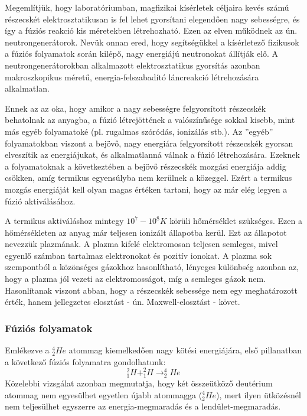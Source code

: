 \documentclass[../main.tex]{subfiles}
\begin{document}
Megemlítjük, hogy laboratóriumban, magfizikai kísérletek céljaira kevés számú részecskét elektrosztatikusan is fel lehet gyorsítani elegendően nagy sebességre, és így a
fúziós reakció kis méretekben létrehozható. Ezen az elven működnek az ún. neutrongenerátorok. Nevük onnan ered, hogy segítségükkel a kísérletező fizikusok a fúziós folyamatok
során kilépő, nagy energiájú neutronokat állítják elő. A neutrongenerátorokban alkalmazott elektrosztatikus gyorsítás azonban makroszkopikus méretű, energia-felszabadító
láncreakció létrehozására alkalmatlan.

Ennek az az oka, hogy amikor a nagy sebességre felgyorsított részecskék behatolnak
az anyagba, a fúzió létrejöttének a valószínűsége sokkal kisebb, mint más egyéb folyamatoké (pl. rugalmas szóródás, ionizálás stb.). Az ”egyéb” folyamatokban viszont a bejövő,
nagy energiára felgyorsított részecskék gyorsan elveszítik az energiájukat, és alkalmatlanná válnak a fúzió létrehozására.
Ezeknek a folyamatoknak a következtében a bejövő részecskék mozgási energiája addig csökken, amíg termikus egyensúlyba nem kerülnek a
közeggel. Ezért a termikus mozgás energiáját kell olyan magas értéken tartani, hogy az már elég legyen a fúzió aktiválásához.

A termikus aktiváláshoz mintegy $10^7 - 10^8 K$ körüli hőmérséklet szükséges. Ezen a
hőmérsékleten az anyag már teljesen ionizált állapotba kerül. Ezt az állapotot nevezzük
plazmának. A plazma kifelé elektromosan teljesen semleges, mivel egyenlő számban tartalmaz elektronokat és pozitív ionokat. A plazma sok szempontból a közönséges gázokhoz
hasonlítható, lényeges különbség azonban az, hogy a plazma jól vezeti az elektromosságot, míg a semleges gázok nem. Hasonlítanak viszont abban, hogy a részecskék sebessége
nem egy meghatározott érték, hanem jellegzetes elosztást - ún. Maxwell-elosztást - követ.

\subsubsection*{Fúziós folyamatok}
Emlékezve a $^4_2He$ atommag kiemelkedően nagy kötési energiájára, első pillanatban a következő fúziós folyamatra gondolhatunk:
\begin{equation}
    ^2_1H + ^2_1H \rightarrow ^4_2He
\end{equation}
Közelebbi vizsgálat azonban megmutatja, hogy két összeütköző deutérium atommag nem
egyesülhet egyetlen újabb atommagga ($^4_2He$), mert ilyen ütközésnél nem teljesülhet egyszerre az energia-megmaradás és a lendület-megmaradás.
\end{document}
